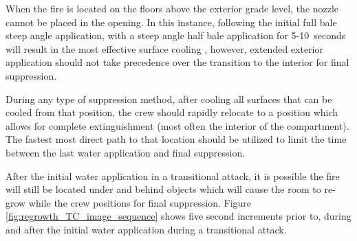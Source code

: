 \documentclass[12pt,oneside]{book}
\begin{document}
When the fire is located on the floors above the exterior grade level, the nozzle cannot be placed in the opening. In this instance, following the initial full bale steep angle application, with a steep angle half bale application for 5-10~seconds will result in the most effective surface cooling \cite{Weinchenk_watermapping}, however, extended exterior application should not take precedence over the transition to the interior for final suppression.  

During any type of suppression method, after cooling all surfaces that can be cooled from that position, the crew should rapidly relocate to a position which allows for complete extinguishment (most often the interior of the compartment). The fastest most direct path to that location should be utilized to limit the time between the last water application and final suppression. 

After the initial water application in a transitional attack, it is possible the fire will still be located under and behind objects which will cause the room to re-grow while the crew positions for final suppression. Figure \ref{fig:regrowth_TC_image_sequence} shows five second increments prior to, during and after the initial water application during a transitional attack. 
\end{document}
